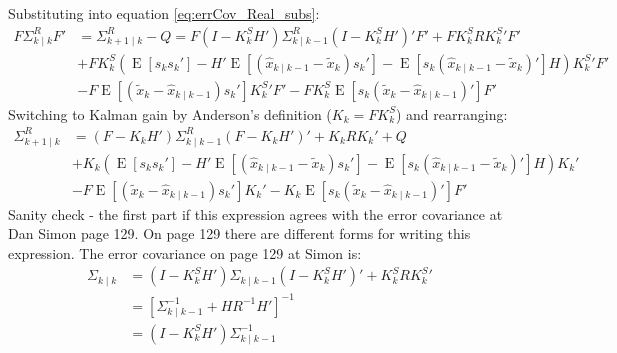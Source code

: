 \documentclass[oneside,12pt]{article}
\begin{document}
%
Substituting into equation \ref{eq:errCov_Real_subs}: 
%
\begin{equation}\label{eq:errCov_Real_subs02}
    \begin{split}
        F\Sigma^R_{k \mid k}F' &= \Sigma^R_{k+1 \mid k} - Q = F(I - K_k^S H')\Sigma^R_{k \mid k-1}(I - K_k^SH')'F' + FK_k^S R K_k^S' F'\\
        & + FK_k^S \left( \operatorname{E}\left[ s_k s_k'\right]
        - H'\operatorname{E}\left[ (\hat{x}_{k \mid k-1} - \tilde{x}_k) s_k' \right] - \operatorname{E}\left[ s_k (\hat{x}_{k \mid k-1} - \tilde{x}_k)'\right]H \right) K_k^S'F'\\
        & - F\operatorname{E}\left[ (\tilde{x}_k - \hat{x}_{k \mid k-1}) s_k'\right]  K_k^S' F' - F K_k^S  \operatorname{E}\left[ s_k(\tilde{x}_k - \hat{x}_{k \mid k-1})'\right]F'
    \end{split}
\end{equation}  
%
Switching to Kalman gain by Anderson's definition ($K_k = FK_k^S$) and rearranging:
%
\begin{equation}\label{eq:errCov_Real_subs03}
    \begin{split}
        \Sigma^R_{k+1 \mid k} &= (F - K_k H')\Sigma^R_{k \mid k-1}(F - K_k H')' + K_k R K_k' + Q\\
        & + K_k \left( \operatorname{E}\left[ s_k s_k'\right]
        - H'\operatorname{E}\left[ (\hat{x}_{k \mid k-1} - \tilde{x}_k) s_k' \right] - \operatorname{E}\left[ s_k (\hat{x}_{k \mid k-1} - \tilde{x}_k)'\right]H \right) K_k'\\
        & - F\operatorname{E}\left[ (\tilde{x}_k - \hat{x}_{k \mid k-1}) s_k'\right]  K_k' - K_k \operatorname{E}\left[ s_k(\tilde{x}_k - \hat{x}_{k \mid k-1})'\right]F'
    \end{split}
\end{equation}  
%
Sanity check - the first part if this expression agrees with the error covariance at Dan Simon page 129. On page 129 there are different forms for writing this expression. The error covariance on page 129 at Simon is:
%
\begin{equation}
    \begin{split}
        \Sigma_{k \mid k} &= (I - K^S_k H')\Sigma_{k \mid k-1}(I - K^S_k H')' + K^S_k R K^S_k'\\
        &= [\Sigma^{-1}_{k \mid k-1} + H R^{-1} H']^{-1}\\
        &= (I - K^S_k H')\Sigma^{-1}_{k \mid k-1}
    \end{split}
\end{equation}
\end{document}
